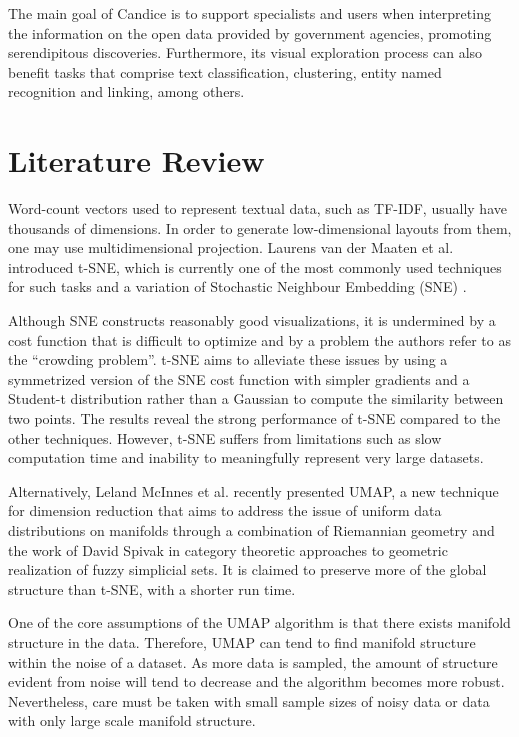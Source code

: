 \documentclass[conference]{IEEEtran}
\begin{document}
The main goal of Candice is to support specialists and users when interpreting the information on the open data provided by government agencies, promoting serendipitous discoveries. Furthermore, its visual exploration process can also benefit tasks that comprise text classification, clustering, entity named recognition and linking, among others.


\section{Literature Review}

Word-count vectors used to represent textual data, such as TF-IDF, usually have thousands of dimensions. In order to generate low-dimensional layouts from them, one may use  multidimensional projection. Laurens van der Maaten et al. \cite{b2} introduced t-SNE,  which is currently one of the most commonly used techniques for such tasks and a variation of Stochastic Neighbour Embedding (SNE) \cite{b4}.

Although SNE constructs reasonably good visualizations, it is undermined by a cost function that is difficult to optimize and by a problem the authors refer to as the “crowding problem”.  t-SNE aims to alleviate these issues by using a symmetrized version of the SNE cost function with simpler gradients and a Student-t distribution rather than a Gaussian to compute the similarity between two points. The results reveal the strong performance of t-SNE compared to the other techniques. However, t-SNE suffers from limitations such as slow computation time and inability to meaningfully represent very large datasets.

Alternatively, Leland McInnes et al. \cite{b3} recently presented UMAP, a new technique for dimension reduction that aims to address the issue of uniform data distributions on manifolds through a combination of Riemannian geometry and the work of David Spivak \cite{b5} in category theoretic approaches to geometric realization of fuzzy simplicial sets. It is claimed to preserve more of the global structure than t-SNE, with a shorter run time. 

One of the core assumptions of the UMAP algorithm is that there exists manifold structure in the data. Therefore, UMAP can tend to find manifold structure within the noise of a dataset. As more data is sampled, the amount of structure evident from noise will tend to decrease and the algorithm becomes more robust. Nevertheless, care must be taken with small sample sizes of noisy data or data with only large scale manifold structure.
\end{document}
